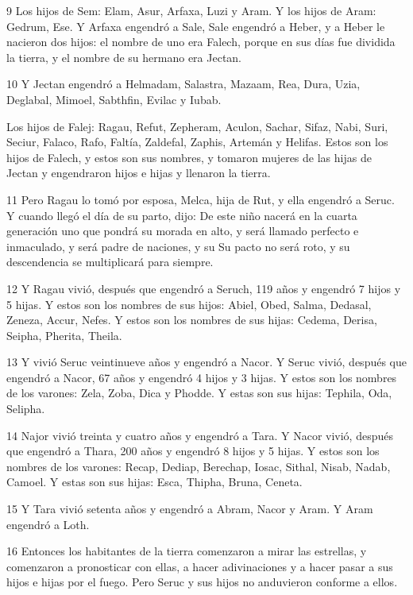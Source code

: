 \par 9 Los hijos de Sem: Elam, Asur, Arfaxa, Luzi y Aram. Y los hijos de Aram: Gedrum, Ese. Y Arfaxa engendró a Sale, Sale engendró a Heber, y a Heber le nacieron dos hijos: el nombre de uno era Falech, porque en sus días fue dividida la tierra, y el nombre de su hermano era Jectan.

\par 10 Y Jectan engendró a Helmadam, Salastra, Mazaam, Rea, Dura, Uzia, Deglabal, Mimoel, Sabthfin, Evilac y Iubab.

Los hijos de Falej: Ragau, Refut, Zepheram, Aculon, Sachar, Sifaz, Nabi, Suri, Seciur, Falaco, Rafo, Faltía, Zaldefal, Zaphis, Artemán y Helifas. Estos son los hijos de Falech, y estos son sus nombres, y tomaron mujeres de las hijas de Jectan y engendraron hijos e hijas y llenaron la tierra.

\par 11 Pero Ragau lo tomó por esposa, Melca, hija de Rut, y ella engendró a Seruc. Y cuando llegó el día de su parto, dijo: De este niño nacerá en la cuarta generación uno que pondrá su morada en alto, y será llamado perfecto e inmaculado, y será padre de naciones, y su Su pacto no será roto, y su descendencia se multiplicará para siempre.

\par 12 Y Ragau vivió, después que engendró a Seruch, 119 años y engendró 7 hijos y 5 hijas. Y estos son los nombres de sus hijos: Abiel, Obed, Salma, Dedasal, Zeneza, Accur, Nefes. Y estos son los nombres de sus hijas: Cedema, Derisa, Seipha, Pherita, Theila.

\par 13 Y vivió Seruc veintinueve años y engendró a Nacor. Y Seruc vivió, después que engendró a Nacor, 67 años y engendró 4 hijos y 3 hijas. Y estos son los nombres de los varones: Zela, Zoba, Dica y Phodde. Y estas son sus hijas: Tephila, Oda, Selipha.

\par 14 Najor vivió treinta y cuatro años y engendró a Tara. Y Nacor vivió, después que engendró a Thara, 200 años y engendró 8 hijos y 5 hijas. Y estos son los nombres de los varones: Recap, Dediap, Berechap, Iosac, Sithal, Nisab, Nadab, Camoel. Y estas son sus hijas: Esca, Thipha, Bruna, Ceneta.

\par 15 Y Tara vivió setenta años y engendró a Abram, Nacor y Aram. Y Aram engendró a Loth.

\par 16 Entonces los habitantes de la tierra comenzaron a mirar las estrellas, y comenzaron a pronosticar con ellas, a hacer adivinaciones y a hacer pasar a sus hijos e hijas por el fuego. Pero Seruc y sus hijos no anduvieron conforme a ellos.

